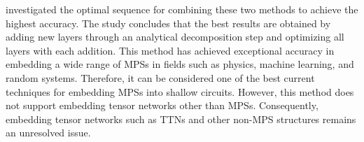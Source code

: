 \documentclass[12pt,dvipdfmx,twoside,openright]{report}
\begin{document}
\cite{mpsdecomp} investigated the optimal sequence for combining these two methods to achieve the highest accuracy.
The study concludes that the best results are obtained by adding new layers through an analytical decomposition step and optimizing all layers with each addition.
This method has achieved exceptional accuracy in embedding a wide range of MPSs in fields such as physics, machine learning, and random systems.
Therefore, it can be considered one of the best current techniques for embedding MPSs into shallow circuits.
However, this method does not support embedding tensor networks other than MPSs.
Consequently, embedding tensor networks such as TTNs and other non-MPS structures remains an unresolved issue.















\end{document}
